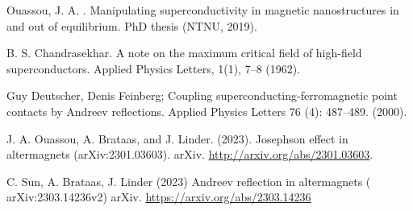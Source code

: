 \documentclass[aps,twocolumn,amsmath,amssymb,preprintnumbers,floatfix,prl,superscriptaddress,longbibliography]{revtex4-2}%
\begin{document}
\begin{thebibliography}{999}
 Ouassou, J. A. . Manipulating superconductivity in magnetic nanostructures in and out of equilibrium. PhD thesis (NTNU, 2019).

 B. S. Chandrasekhar. A note on the maximum critical field of high-field superconductors. Applied Physics Letters, 1(1), 7–8 (1962).

 Guy Deutscher, Denis Feinberg; Coupling superconducting-ferromagnetic point contacts by Andreev reflections. Applied Physics Letters 76 (4): 487–489. (2000).

 J. A. Ouassou, A. Brataas, and J. Linder. (2023). Josephson effect in altermagnets (arXiv:2301.03603). arXiv. \url{http://arxiv.org/abs/2301.03603}.


 C. Sun, A. Brataas, J. Linder (2023) Andreev reflection in altermagnets ( arXiv:2303.14236v2) arXiv. \url{https://arxiv.org/abs/2303.14236}
\end{thebibliography}
\end{document}
